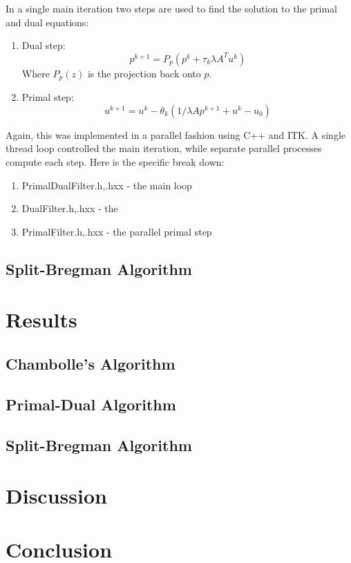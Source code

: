 \documentclass[11pt]{article}
\begin{document}
In a single main iteration two steps are used to find the solution to the primal and dual equations:
\begin{enumerate}
\item Dual step:
\begin{equation}
p^{k+1} = P_p(p^k + \tau_k \lambda A^T u^k)
\label{pd:dual}
\end{equation}
Where $P_p(z)$ is the projection back onto $p$.
\item Primal step:
\begin{equation}
u^{k+1} = u^k - \theta_k (1/\lambda Ap^{k+1} + u^k-u_0)
\label{pd:primal}
\end{equation}
\end{enumerate}

Again, this was implemented in a parallel fashion using C++ and ITK.
A single thread loop controlled the main iteration, while separate parallel processes compute each step.
Here is the specific break down:
\begin{enumerate}
\item PrimalDualFilter.h,.hxx - the main loop
\item DualFilter.h,.hxx - the 
\item PrimalFilter.h,.hxx - the parallel primal step
\end{enumerate}


\subsection{Split-Bregman Algorithm}

\section{Results}
\subsection{Chambolle's Algorithm}
\subsection{Primal-Dual Algorithm}
\subsection{Split-Bregman Algorithm}

\section{Discussion}

\section{Conclusion}


\end{document}
